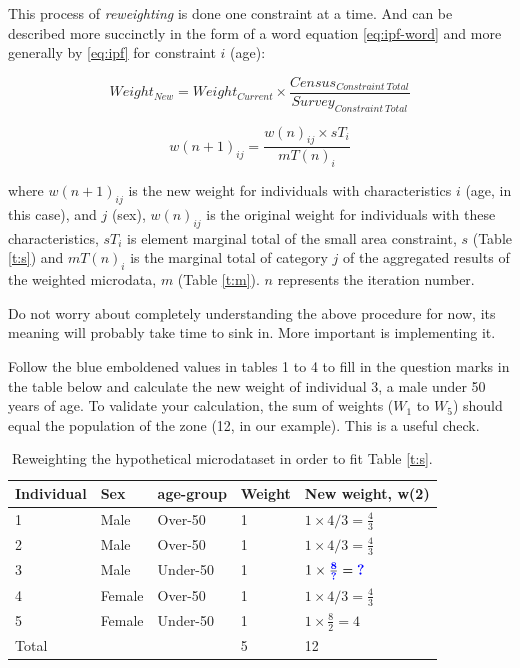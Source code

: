 \documentclass[a4paper, 11pt, twoside]{article}
\begin{document}
This process of \emph{reweighting} is done one constraint at a time. And can
be described more succinctly in the form of a word equation
\cref{eq:ipf-word} and more generally by \cref{eq:ipf} for constraint $i$ (age):

\begin{equation}
  Weight_{New} = Weight_{Current} \times \frac{Census_{Constraint \: Total}}{Survey_{Constraint \: Total}}
\label{eq:ipf-word}
\end{equation}

\begin{equation}
w(n+1)_{ij} = \frac{w(n)_{ij} \times sT_{i}}{mT(n)_{i}}
\label{eq:ipf}
\end{equation}

where $w(n+1)_{ij}$ is the new weight for individuals with characteristics $i$
(age, in this case), and $j$ (sex),  $w(n)_{ij}$ is the original
weight for individuals with these characteristics, $sT_{i}$ is element
marginal total of the small area constraint, $s$
(Table \ref{t:s}) and $mT(n)_{i}$ is the marginal total of category
$j$ of the aggregated results of the weighted
microdata, $m$ (Table \ref{t:m}).
$n$ represents the iteration number.

Do not worry about completely understanding the above procedure for now, its
meaning will probably take time to sink in.
More important is implementing it.

Follow the blue emboldened values in tables 1 to 4 to fill in the
question marks in the table below and calculate the new weight
of individual 3, a male under 50 years of age.
To validate your calculation, the sum of weights ($W_1$ to $W_5$)
should equal the population of the zone (12, in our example). This is a
useful check.

\begin{table}[htbp]
\centering
\caption{Reweighting the hypothetical microdataset in order to fit
Table \ref{t:s}.}
\begin{tabular}{lllll}
\toprule
{Individual} & {Sex} & {age-group} & {Weight} &
{New weight, w(2)} \\ \midrule
1 & Male & Over-50 & 1 & $1 \times 4/3 = \frac{4}{3}$ \\
2 & Male & Over-50 & 1 & $1 \times 4/3 = \frac{4}{3}$ \\
3 & Male & Under-50 & 1 & $1 \times \frac{\textbf{\color{blue}8}}{\textbf{\color{blue}?}} = \textbf{\color{blue}?}$ \\
4 & Female & Over-50 & 1 & $1 \times 4/3 = \frac{4}{3}$ \\
5 & Female & Under-50 & 1 & $1 \times \frac{8}{2} = 4$ \\
\midrule
Total & & & 5 & 12 \\
\bottomrule
\end{tabular}
\label{t:new-weights}
\end{table}
\end{document}
